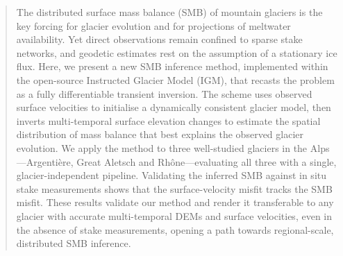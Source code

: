 \begin{abstract}
	The distributed surface mass balance (SMB) of mountain glaciers is the key
	forcing for glacier evolution and for projections of meltwater availability.
	Yet direct observations remain confined to sparse stake networks, and geodetic
	estimates rest on the assumption of a stationary ice flux.
	Here, we present a new SMB inference method, implemented within the open-source Instructed Glacier
	Model (IGM), that recasts the problem as a fully differentiable transient
	inversion. The scheme uses observed surface velocities to initialise a
	dynamically consistent glacier model, then inverts multi-temporal surface
	elevation changes to estimate the spatial distribution of mass balance that best
	explains the observed glacier evolution. We apply the method to three
	well-studied glaciers in the Alps---Argenti\`ere, Great Aletsch and
	Rh\^one---evaluating all three with a single, glacier-independent pipeline.
	Validating the inferred SMB against in situ stake measurements shows that the
	surface-velocity misfit tracks the SMB misfit.
	These results validate our method
	and render it transferable to any glacier with accurate multi-temporal DEMs and
	surface velocities, even in the absence of stake measurements, opening a path
	towards regional-scale, distributed SMB inference.
\end{abstract}
